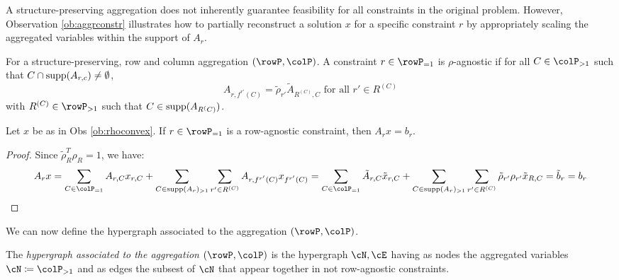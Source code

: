 {A structure-preserving aggregation does not inherently guarantee feasibility for all constraints in the original problem. However, Observation \ref{ob:aggrconstr} illustrates how to partially reconstruct a solution \(x\) for a specific constraint \(r\) by appropriately scaling the aggregated variables within the support of \(A_r\). 

\begin{definition}
  For a structure-preserving, row and column aggregation \((\rowP,\colP)\). A constraint \(r \in \rowP_{=1}\) is \(\rho\)-agnostic if for all \(C \in \colP_{>1}\) such that \(C \cap \operatorname{supp}(A_{r,c}) \neq \emptyset\), 
  \[A_{r,f^{r'}(C)} = \tilde{\rho}_{r'}\tilde{A}_{R^(C),C} \text{ for all } r' \in R^{(C)} \]
   with \(R^{(C)} \in \rowP_{>1}\) such that \(C \in \operatorname{supp}(A_{R^(C)})\).
\end{definition}
\begin{observation}
 Let \(x\) be as in Obs \ref{ob:rhoconvex}. If \(r \in \rowP_{=1}\) is a row-agnostic constraint, then \(A_rx=b_r\).
\end{observation}

\begin{proof}
Since \(\tilde{\rho}_R^T \rho_R = 1\), we have:
  \[
  A_rx = \sum_{C \in \colP_{=1}}A_{r,C}x_{r,C} +  \sum_{C \in \supp(A_{r})_{>1}} \sum_{r' \in R^{(C)}} A_{r,f^{r'}(C)}x_{f^{r'}(C)} = \sum_{C \in \colP_{=1}}\tilde{A}_{r,C}\tilde{x}_{r,C} +  \sum_{C \in \supp(A_{r})_{>1}} \sum_{r' \in R^{(C)}}\tilde{\rho}_{r'} \rho_{r'}\tilde{x}_{R,C} = \tilde{b}_r = b_r
   \]
\end{proof}

We can now define the hypergraph associated to the aggregation \((\rowP, \colP)\).
\begin{definition}
  The \emph{hypergraph associated to the aggregation \((\rowP, \colP)\)} is the hypergraph \(\cN, \cE\) having as nodes the aggregated variables \(\cN \coloneqq \colP_{>1}\) and as edges the subsest of \(\cN\) that appear together in not row-agnostic constraints.
\end{definition}

}
